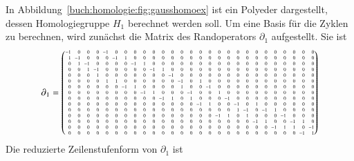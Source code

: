 \begin{beispiel}
\label{buch:homologie:beispiel:gausshomo}
In Abbildung~\ref{buch:homologie:fig:gausshomoex} ist ein Polyeder 
dargestellt, dessen Homologiegruppe $H_1$ berechnet werden soll.
Um eine Basis für die Zyklen zu berechnen, wird zunächst die Matrix
des Randoperators $\partial_1$ aufgestellt.
Sie ist
\[
\setcounter{MaxMatrixCols}{27}
\partial_1
=
\tiny
\setlength\arraycolsep{2pt}
\begin{pmatrix*}[r]
-1& 0& 0& 0&-1& 0& 0& 0& 0& 0& 0& 0& 0& 0& 0& 0& 0& 0& 0& 0& 0& 0& 0& 0& 0& 0& 0\\ %
 1&-1& 0& 0& 0&-1& 1& 0& 0& 0& 0& 0& 0& 0& 0& 0& 0& 0& 0& 0& 0& 0& 0& 0& 0& 0& 0\\ %
 0& 1&-1& 0& 0& 0& 0&-1& 1& 0& 0& 0& 0& 0& 0& 0& 0& 0& 0& 0& 0& 0& 0& 0& 0& 0& 0\\ %
 0& 0& 1&-1& 0& 0& 0& 0& 0&-1& 1& 0& 0& 0& 0& 0& 0& 0& 0& 0& 0& 0& 0& 0& 0& 0& 0\\ %
 0& 0& 0& 1& 0& 0& 0& 0& 0& 0& 0&-1& 0& 0& 0& 0& 0& 0& 0& 0& 0& 0& 0& 0& 0& 0& 0\\ %
 0& 0& 0& 0& 1& 1& 0& 0& 0& 0& 0& 0&-1& 0& 1& 0& 0& 0& 0& 0& 0& 0& 0& 0& 0& 0& 0\\ %
 0& 0& 0& 0& 0& 0&-1& 1& 0& 0& 0& 0& 1& 0& 0&-1& 0& 0& 0& 0& 0& 0& 0& 0& 0& 0& 0\\ %
 0& 0& 0& 0& 0& 0& 0& 0&-1& 1& 0& 0& 0&-1& 0& 0& 1& 0& 0& 0& 0& 0& 0& 0& 0& 0& 0\\ %
 0& 0& 0& 0& 0& 0& 0& 0& 0& 0&-1& 1& 0& 1& 0& 0& 0&-1& 0& 0& 0& 0& 0& 0& 0& 0& 0\\ %
 0& 0& 0& 0& 0& 0& 0& 0& 0& 0& 0& 0& 0& 0&-1& 1& 0& 0&-1& 0& 1& 0& 0& 0& 0& 0& 0\\ %
 0& 0& 0& 0& 0& 0& 0& 0& 0& 0& 0& 0& 0& 0& 0& 0& 0& 0& 1&-1& 0&-1& 1& 0& 0& 0& 0\\ %
 0& 0& 0& 0& 0& 0& 0& 0& 0& 0& 0& 0& 0& 0& 0& 0&-1& 1& 0& 1& 0& 0& 0&-1& 0& 0& 0\\ %
 0& 0& 0& 0& 0& 0& 0& 0& 0& 0& 0& 0& 0& 0& 0& 0& 0& 0& 0& 0&-1& 1& 0& 0&-1& 1& 0\\ %
 0& 0& 0& 0& 0& 0& 0& 0& 0& 0& 0& 0& 0& 0& 0& 0& 0& 0& 0& 0& 0& 0&-1& 1& 1& 0&-1\\ %
 0& 0& 0& 0& 0& 0& 0& 0& 0& 0& 0& 0& 0& 0& 0& 0& 0& 0& 0& 0& 0& 0& 0& 0& 0&-1& 1\\ %
\end{pmatrix*}
\]
Die reduzierte Zeilenstufenform von $\partial_1$ ist
\begin{center}

\end{center}
\end{beispiel}
